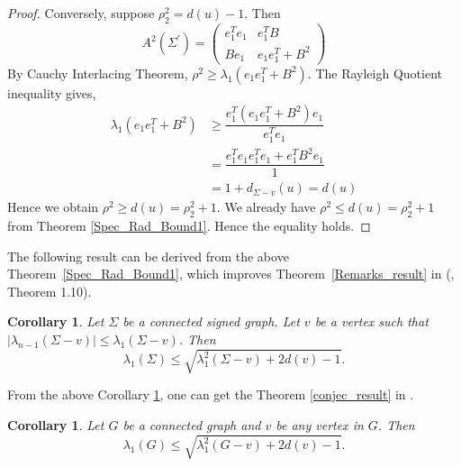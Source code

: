 \documentclass[12pt]{article}
\theoremstyle{plain}
\newtheorem{corollary}[theorem]{Corollary}
\numberwithin{equation}{section}
\begin{document}
\begin{proof}
		Conversely, suppose $\rho_2^2 = d(u)-1$. Then
		\begin{equation*}
			A^2(\Sigma^\prime)=
			\begin{pmatrix}
				e_1^Te_1 & e_1^TB\\
				Be_1 & e_1 e_1^T+B^2
			\end{pmatrix}
		\end{equation*}
		By Cauchy Interlacing Theorem,
		$\rho^2 \geq \lambda_1(e_1 e_1^T+B^2)$. The Rayleigh Quotient inequality gives,
		\begin{align*}
			\lambda_1(e_1 e_1^T+B^2) &\geq \dfrac{e_1^T(e_1 e_1^T+B^2)e_1}{e_1^T e_1}\\
			&=\dfrac{e_1^Te_1 e_1^Te_1+e_1^TB^2e_1}{1}\\
			&=1+d_{\Sigma-v}(u)=d(u)
		\end{align*}
		Hence we obtain $\rho^2 \geq d(u)= \rho_2^2 +1$. We already have $\rho^2 \leq d(u)= \rho_2^2 +1$ from Theorem \ref{Spec_Rad_Bound1}. Hence the equality holds.
	\end{proof}
	
	The following result can be derived from the above Theorem~\ref {Spec_Rad_Bound1}, which improves Theorem~\ref {Remarks_result} in (\cite{lan2023remarks}, Theorem 1.10).
	\begin{corollary}\label{Remarks_result_coro}
		Let $\Sigma$ be a connected signed graph. Let $v$ be a vertex such that $|\lambda_{n-1}(\Sigma-v)|\leq \lambda_{1}(\Sigma-v) $. Then $$\lambda_1(\Sigma)\leq \sqrt{\lambda_1^2(\Sigma-v)+2d(v)-1}.$$
	\end{corollary}
	
	From the above Corollary \ref{Remarks_result_coro}, one can get the Theorem \ref{conjec_result} in \cite{sun2020conjecture}.
	\begin{corollary}
		Let $G$ be a connected graph and $v$ be any vertex in $G$. Then 
		$$ \lambda_{1}(G) \leq \sqrt{\lambda_{1}^2(G-v)+2d(v)-1}.$$
	\end{corollary}
	
\end{document}
